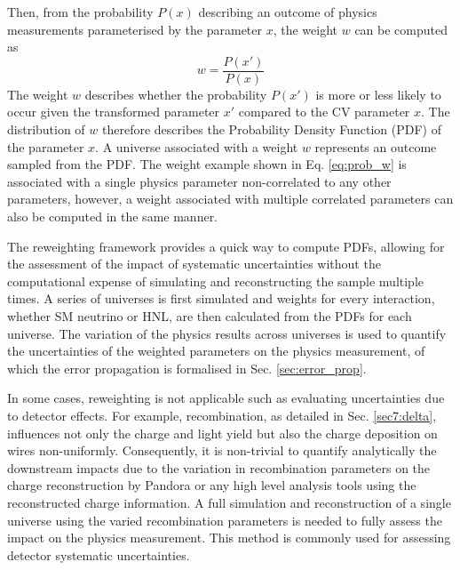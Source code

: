 
Then, from the probability $P(x)$ describing an outcome of physics measurements parameterised by the parameter $x$, the weight $w$ can be computed as
\begin{equation}
\label{eq:prob_w}
	w = \frac{P(x')}{P(x)}
\end{equation}
The weight $w$ describes whether the probability $P(x')$ is more or less likely to occur given the transformed parameter $x'$ compared to the CV parameter $x$.
The distribution of $w$ therefore describes the Probability Density Function (PDF) of the parameter $x$.
A universe associated with a weight $w$ represents an outcome sampled from the PDF.
The weight example shown in Eq. \ref{eq:prob_w} is associated with a single physics parameter non-correlated to any other parameters, however, a weight associated with multiple correlated parameters can also be computed in the same manner.

The reweighting framework provides a quick way to compute PDFs, allowing for the assessment of the impact of systematic uncertainties without the computational expense of simulating and reconstructing the sample multiple times.
A series of universes is first simulated and weights for every interaction, whether SM neutrino or HNL, are then 
calculated from the PDFs for each universe.                                                                      
The variation of the physics results across universes is used to quantify the uncertainties of the weighted parameters on the physics measurement, of which the error propagation is formalised in Sec. \ref{sec:error_prop}.

In some cases, reweighting is not applicable such as evaluating uncertainties due to detector effects.
For example, recombination, as detailed in Sec. \ref{sec7:delta}, influences not only the charge and light yield but also the charge deposition on wires non-uniformly. 
Consequently, it is non-trivial to quantify analytically the downstream impacts due to the variation in recombination parameters on the charge reconstruction by Pandora or any high level analysis tools using the reconstructed charge information.
A full simulation and reconstruction of a single universe using the varied recombination parameters is needed to fully assess the impact on the physics measurement. 
This method is commonly used for assessing detector systematic uncertainties.

